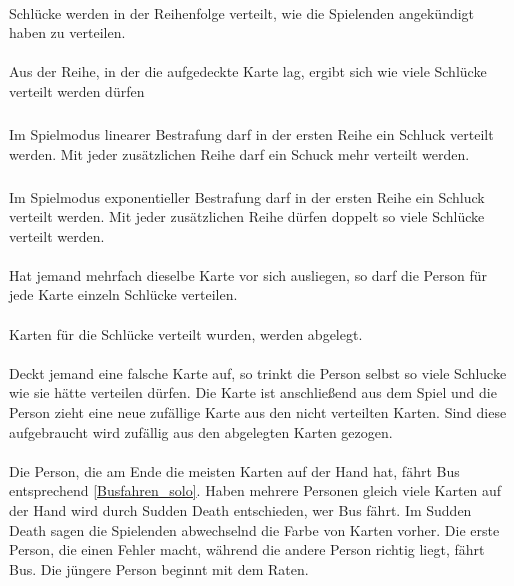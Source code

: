 \paragraph{}
Schlücke werden in der Reihenfolge verteilt, wie die Spielenden angekündigt haben zu verteilen.

\paragraph{} \label{Busfahren_group:Spielablauf:Bestrafung}
Aus der Reihe, in der die aufgedeckte Karte lag, ergibt sich wie viele Schlücke verteilt werden dürfen
\subparagraph{} \label{Busfahren_group:Spielablauf:Bestrafung:linear}
Im Spielmodus linearer Bestrafung darf in der ersten Reihe ein Schluck verteilt werden.
Mit jeder zusätzlichen Reihe darf ein Schuck mehr verteilt werden.

\subparagraph{} \label{Busfahren_group:Spielablauf:Bestrafung:exponentiell}
Im Spielmodus exponentieller Bestrafung darf in der ersten Reihe ein Schluck verteilt werden.
Mit jeder zusätzlichen Reihe dürfen doppelt so viele Schlücke verteilt werden.

\paragraph{}
Hat jemand mehrfach dieselbe Karte vor sich ausliegen, so darf die Person für jede Karte einzeln Schlücke verteilen.

\paragraph{}
Karten für die Schlücke verteilt wurden, werden abgelegt.

\paragraph{} \label{Busfahren_group:Spielablauf:Ziehen}
Deckt jemand eine falsche Karte auf, so trinkt die Person selbst so viele Schlucke wie sie hätte verteilen dürfen.
Die Karte ist anschließend aus dem Spiel und die Person zieht eine neue zufällige Karte aus den nicht verteilten Karten.
Sind diese aufgebraucht wird zufällig aus den abgelegten Karten gezogen.

\paragraph{}
Die Person, die am Ende die meisten Karten auf der Hand hat, fährt Bus entsprechend \ref{Busfahren_solo}.
Haben mehrere Personen gleich viele Karten auf der Hand wird durch Sudden Death entschieden, wer Bus fährt.
Im Sudden Death sagen die Spielenden abwechselnd die Farbe von Karten vorher.
Die erste Person, die einen Fehler macht, während die andere Person richtig liegt, fährt Bus.
Die jüngere Person beginnt mit dem Raten.

